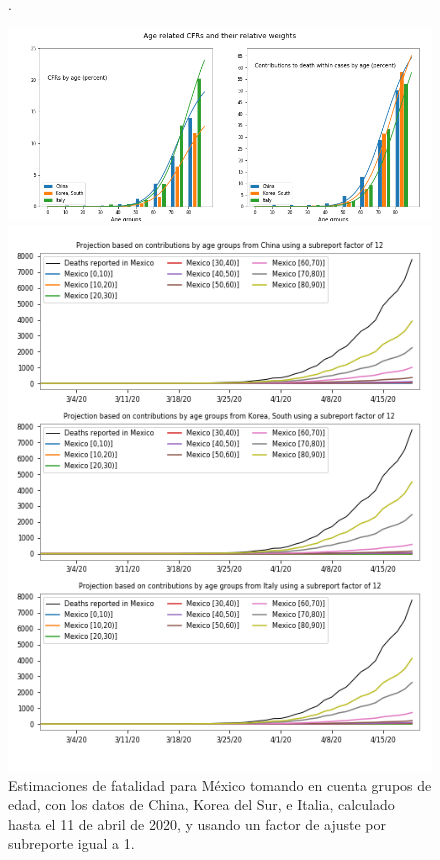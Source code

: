 %
\begin{figure}[h]
\caption{Estimaciones de fatalidad para México tomando en cuenta grupos de edad, con los datos de China, Korea del Sur, e Italia, calculado hasta el 11 de abril de 2020, y usando un factor de ajuste por subreporte igual a 1. }. \label{fig:estimates}
\begin{minipage}{0.6\textwidth}
\includegraphics[width=\textwidth]{../tsam_Covid19_analysis/figures/tsam_Covid19_JHU_cfr+propDeathCases_ByAge_China+SKorea+Italy_OneFigure.png}
\end{minipage}%
\begin{minipage}{0.4\textwidth}
\includegraphics[width=\textwidth]
{../tsam_Covid19_analysis/figures/tsam_Covid19_JHU_cfr+propDeathCasesByAgeTS_EstimatesMexico_subReportFactor12.png}
\end{minipage}%
\end{figure}

